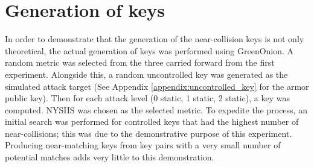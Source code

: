 \section{Generation of keys}
\label{sec:key_gen}
In order to demonstrate that the generation of the near-collision keys is not only theoretical, the actual generation of keys was performed using GreenOnion. A random metric was selected from the three carried forward from the first experiment. Alongside this, a random uncontrolled key was generated as the simulated attack target (See Appendix \ref{appendix:uncontrolled_key} for the armor public key). Then for each attack level (0 static, 1 static, 2 static), a key was computed. NYSIIS was chosen as the selected metric. To expedite the process, an initial search was performed for controlled keys that had the highest number of near-collisions; this was due to the demonstrative purpose of this experiment. Producing near-matching keys from key pairs with a very small number of potential matches adds very little to this demonstration.

